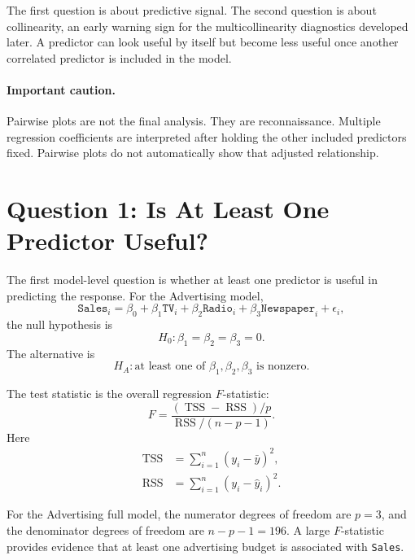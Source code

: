 The first question is about predictive signal.  The second question is about collinearity, an early warning sign for the multicollinearity diagnostics developed later.  A predictor can look useful by itself but become less useful once another correlated predictor is included in the model.

\paragraph{Important caution.}
Pairwise plots are not the final analysis.  They are reconnaissance.  Multiple regression coefficients are interpreted after holding the other included predictors fixed.  Pairwise plots do not automatically show that adjusted relationship.

\section{Question 1: Is At Least One Predictor Useful?}

The first model-level question is whether at least one predictor is useful in predicting the response.  For the Advertising model,
\begin{equation}
  \texttt{Sales}_i
  =\beta_0
  +\beta_1\texttt{TV}_i
  +\beta_2\texttt{Radio}_i
  +\beta_3\texttt{Newspaper}_i
  +\epsilon_i,
\end{equation}
the null hypothesis is
\begin{equation}
  H_0:\beta_1=\beta_2=\beta_3=0.
\end{equation}
The alternative is
\begin{equation}
  H_A:\text{at least one of }\beta_1,\beta_2,\beta_3\text{ is nonzero.}
\end{equation}

The test statistic is the overall regression \(F\)-statistic:
\begin{equation}
  F=\frac{(\operatorname{TSS}-\operatorname{RSS})/p}{\operatorname{RSS}/(n-p-1)}.
\end{equation}
Here
\begin{align}
  \operatorname{TSS} &= \sum_{i=1}^n (y_i-\bar{y})^2,\\
  \operatorname{RSS} &= \sum_{i=1}^n (y_i-\widehat{y}_i)^2.
\end{align}

For the Advertising full model, the numerator degrees of freedom are \(p=3\), and the denominator degrees of freedom are \(n-p-1=196\).  A large \(F\)-statistic provides evidence that at least one advertising budget is associated with \texttt{Sales}.

